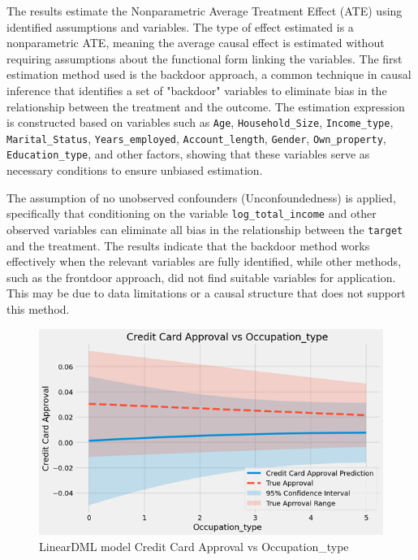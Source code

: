 \documentclass[12pt]{report}
\begin{document}
    The results estimate the Nonparametric Average Treatment Effect (ATE) using identified assumptions and variables. The type of effect estimated is a nonparametric ATE, meaning the average causal effect is estimated without requiring assumptions about the functional form linking the variables. The first estimation method used is the backdoor approach, a common technique in causal inference that identifies a set of "backdoor" variables to eliminate bias in the relationship between the treatment and the outcome. The estimation expression is constructed based on variables such as \texttt{Age}, \texttt{Household\_Size}, \texttt{Income\_type}, \texttt{Marital\_Status}, \texttt{Years\_employed}, \texttt{Account\_length}, \texttt{Gender}, \texttt{Own\_property}, \texttt{Education\_type}, and other factors, showing that these variables serve as necessary conditions to ensure unbiased estimation.

    The assumption of no unobserved confounders (Unconfoundedness) is applied, specifically that conditioning on the variable \texttt{log\_total\_income} and other observed variables can eliminate all bias in the relationship between the \texttt{target} and the treatment. The results indicate that the backdoor method works effectively when the relevant variables are fully identified, while other methods, such as the frontdoor approach, did not find suitable variables for application. This may be due to data limitations or a causal structure that does not support this method.

    \begin{figure}[h!]
        \centering
        \includegraphics[width=\textwidth]{resources/pic/Credit Card Approval vs Occupation_type.png}
        \caption{LinearDML model Credit Card Approval vs Occupation\_type}
        \label{fig:Credit Card Approval vs Occupation_type}
    \end{figure}
\end{document}
